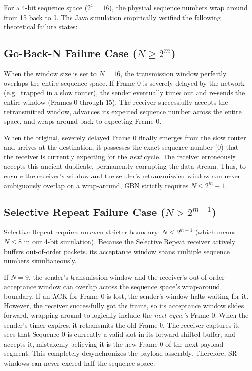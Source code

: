 \documentclass[12pt]{article}
\begin{document}
For a 4-bit sequence space ($2^4 = 16$), the physical sequence numbers wrap around from 15 back to 0. The Java simulation empirically verified the following theoretical failure states:

\subsection{Go-Back-N Failure Case ($N \ge 2^m$)}
When the window size is set to $N = 16$, the transmission window perfectly overlaps the entire sequence space. If Frame 0 is severely delayed by the network (e.g., trapped in a slow router), the sender eventually times out and re-sends the entire window (Frames 0 through 15). The receiver successfully accepts the retransmitted window, advances its expected sequence number across the entire space, and wraps around back to expecting Frame 0. 

When the original, severely delayed Frame 0 finally emerges from the slow router and arrives at the destination, it possesses the exact sequence number (0) that the receiver is currently expecting for the \textit{next} cycle. The receiver erroneously accepts this ancient duplicate, permanently corrupting the data stream. Thus, to ensure the receiver's window and the sender's retransmission window can never ambiguously overlap on a wrap-around, GBN strictly requires $N \le 2^m - 1$.

\subsection{Selective Repeat Failure Case ($N > 2^{m-1}$)}
Selective Repeat requires an even stricter boundary: $N \le 2^{m-1}$ (which means $N \le 8$ in our 4-bit simulation). Because the Selective Repeat receiver actively buffers out-of-order packets, its acceptance window spans multiple sequence numbers simultaneously. 

If $N = 9$, the sender's transmission window and the receiver's out-of-order acceptance window can overlap across the sequence space's wrap-around boundary. If an ACK for Frame 0 is lost, the sender's window halts waiting for it. However, the receiver successfully got the frame, so its acceptance window slides forward, wrapping around to logically include the \textit{next cycle's} Frame 0. When the sender's timer expires, it retransmits the old Frame 0. The receiver captures it, sees that Sequence 0 is currently a valid slot in its forward-shifted buffer, and accepts it, mistakenly believing it is the new Frame 0 of the next payload segment. This completely desynchronizes the payload assembly. Therefore, SR windows can never exceed half the sequence space.
\end{document}
